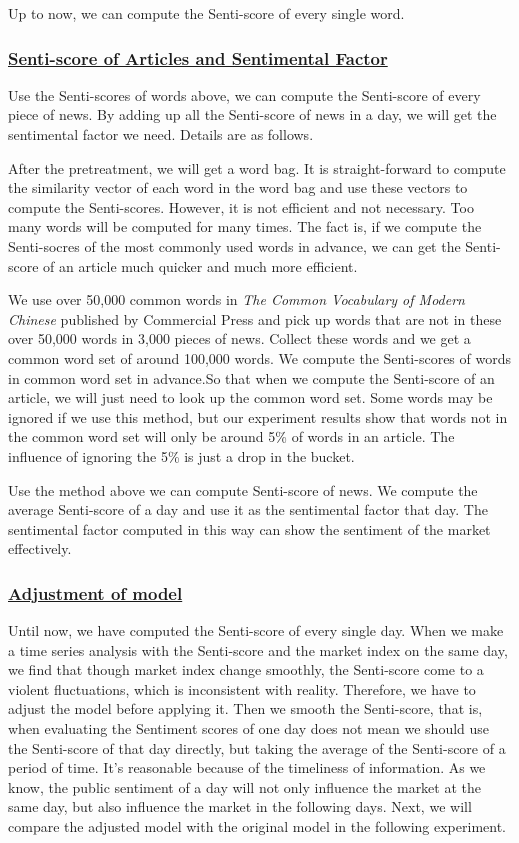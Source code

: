 \documentclass[10pt, conference, compsocconf]{IEEEtran}
\begin{document}
Up to now, we can compute the Senti-score of every single word.

\subsubsection{\underline{Senti-score of Articles and Sentimental Factor}}
Use the Senti-scores of words above, we can compute the Senti-score of every piece of news. By adding up all the Senti-score of news in a day, we will get the sentimental factor we need. Details are as follows.

After the pretreatment, we will get a word bag. It is straight-forward to compute the similarity vector of each word in the word bag and use these vectors to compute the Senti-scores. However, it is not efficient and not necessary. Too many words will be computed for many times. The fact is, if we compute the Senti-socres of the most commonly used words in advance, we can get the Senti-score of an article much quicker and much more efficient.

We use over 50,000 common words in \emph{The Common Vocabulary of Modern Chinese} published by Commercial Press and pick up words that are not in these over 50,000 words in 3,000 pieces of news. Collect these words and we get a common word set of around 100,000 words. We compute the Senti-scores of words in common word set in advance.So that when we compute the Senti-score of an article, we will just need to look up the common word set. Some words may be ignored if we use this method, but our experiment results show that words not in the common word set will only be around 5\% of words in an article. The influence of ignoring the 5\% is just a drop in the bucket.

Use the method above we can compute Senti-score of news. We compute the average Senti-score of a day and use it as the sentimental factor that day. The sentimental factor computed in this way can show the sentiment of the market effectively.

\subsubsection{\underline{Adjustment of model}}

Until now, we have computed the Senti-score of every single day. When we make a time series analysis with the Senti-score and the market index on the same day, we find that though market index change smoothly, the Senti-score come to a violent fluctuations, which is inconsistent with reality. Therefore, we have to adjust the model before applying it. Then we smooth the Senti-score, that is, when evaluating the Sentiment scores of one day does not mean we should use the Senti-score of that day directly, but taking the average of the Senti-score of a period of time. It's reasonable because of the timeliness of information. As we know, the public sentiment of a day will not only influence the market at the same day, but also influence the market in the following days. Next, we will compare the adjusted model with the original model in the following experiment.
\end{document}
